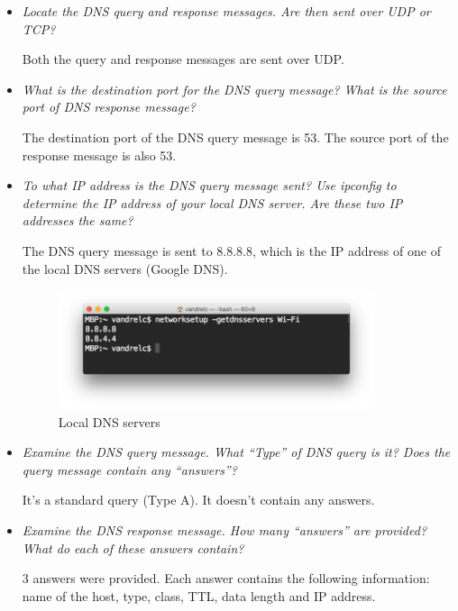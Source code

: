 \documentclass[11pt]{article}
\begin{document}
\begin{itemize}
	\setlength\itemsep{.5cm}

	\item
		\textit{Locate the DNS query and response messages. Are then sent over UDP or TCP?}
		\par Both the query and response messages are sent over UDP.

	\item
		\textit{What is the destination port for the DNS query message? What is the source port of DNS
response message?}
		\par The destination port of the DNS query message is 53. The source port of the response message is also 53.
		
	\item
		\textit{To what IP address is the DNS query message sent? Use ipconfig to determine the IP address
of your local DNS server. Are these two IP addresses the same?}
		\par The DNS query message is sent to 8.8.8.8, which is the IP address of one of the local DNS servers (Google DNS).
		
		\begin{figure}[H]
		\centering
		\caption{Local DNS servers}
		\includegraphics[width=350px]{06}
		\end{figure}
		
	\item
		\textit{Examine the DNS query message. What “Type” of DNS query is it? Does the query message
contain any “answers”?}
		\par It's a standard query (Type A). It doesn't contain any answers.

	\item
		\textit{Examine the DNS response message. How many “answers” are provided? What do each of
these answers contain?}
		\par 3 answers were provided. Each answer contains the following information: name of the host, type, class, TTL, data length and IP address.
		

\end{itemize}
\end{document}
